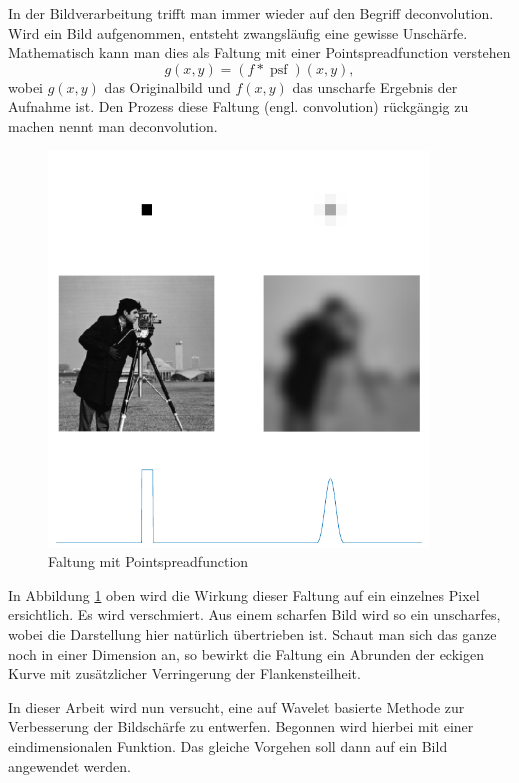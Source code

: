 In der Bildverarbeitung trifft man immer wieder auf den Begriff deconvolution.
Wird ein Bild aufgenommen, entsteht zwangsläufig eine gewisse Unschärfe.
Mathematisch kann man dies als Faltung mit einer Pointspreadfunction verstehen
$$g(x,y) = (f*\operatorname{psf})(x,y),$$
wobei $g(x,y)$ das Originalbild und $f(x,y)$ das unscharfe Ergebnis der Aufnahme ist.
Den Prozess diese Faltung (engl. convolution) rückgängig zu machen nennt man deconvolution.
\begin{figure}[h]
\centering
\includegraphics[width=0.9\textwidth]{./papers/deconvolve/pictures/psf.pdf}
\caption{Faltung mit Pointspreadfunction\label{deconvolve:pic}}
\end{figure}

In Abbildung \ref{deconvolve:pic} oben wird die Wirkung dieser Faltung auf ein einzelnes Pixel ersichtlich.
Es wird \glqq verschmiert\grqq{}.
Aus einem scharfen Bild wird so ein unscharfes, wobei die Darstellung hier natürlich übertrieben ist.
Schaut man sich das ganze noch in einer Dimension an, so bewirkt die Faltung ein Abrunden der eckigen Kurve mit zusätzlicher Verringerung der Flankensteilheit.

In dieser Arbeit wird nun versucht, eine auf Wavelet basierte Methode zur Verbesserung der Bildschärfe zu entwerfen.
Begonnen wird hierbei mit einer eindimensionalen Funktion.
Das gleiche Vorgehen soll dann auf ein Bild angewendet werden.